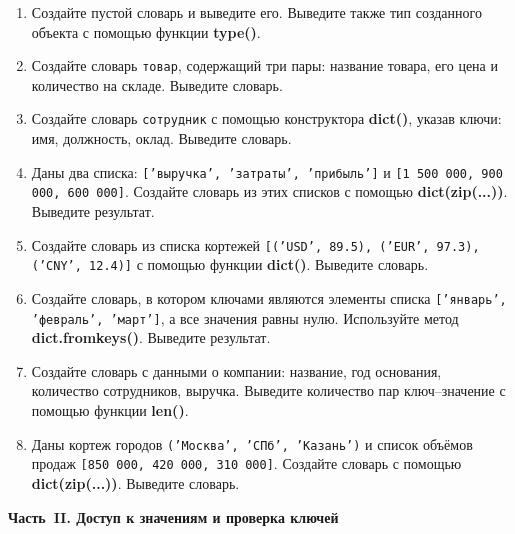 \documentclass[a4,12pt]{article}
\theoremstyle{remark}
\begin{document}
\begin{enumerate}

    \item Создайте пустой словарь и выведите его. Выведите также тип созданного объекта с помощью функции \textbf{type()}.

    \item Создайте словарь \texttt{товар}, содержащий три пары: название товара, его цена и количество на складе. Выведите словарь.

    \item Создайте словарь \texttt{сотрудник} с помощью конструктора \textbf{dict()}, указав ключи: имя, должность, оклад. Выведите словарь.

    \item Даны два списка: \texttt{['выручка', 'затраты', 'прибыль']} и \texttt{[1\,500\,000, 900\,000, 600\,000]}. Создайте словарь из этих списков с помощью \textbf{dict(zip(...))}. Выведите результат.

    \item Создайте словарь из списка кортежей \texttt{[('USD', 89.5), ('EUR', 97.3), ('CNY', 12.4)]} с помощью функции \textbf{dict()}. Выведите словарь.

    \item Создайте словарь, в котором ключами являются элементы списка \texttt{['январь', 'февраль', 'март']}, а все значения равны нулю. Используйте метод \textbf{dict.fromkeys()}. Выведите результат.

    \item Создайте словарь с данными о компании: название, год основания, количество сотрудников, выручка. Выведите количество пар ключ--значение с помощью функции \textbf{len()}.

    \item Даны кортеж городов \texttt{('Москва', 'СПб', 'Казань')} и список объёмов продаж \texttt{[850\,000, 420\,000, 310\,000]}. Создайте словарь с помощью \textbf{dict(zip(...))}. Выведите словарь.

\end{enumerate}

\bigskip
\noindent\textbf{Часть~II. Доступ к значениям и проверка ключей}
\end{document}

